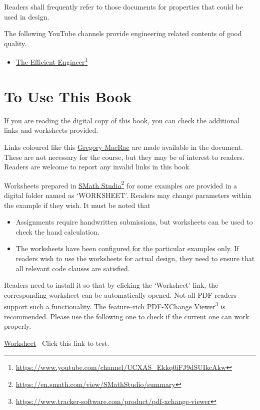 Readers shall frequently refer to those documents for properties that could be used in design.

The following YouTube channels provide engineering related contents of good quality.
\begin{itemize}
\item \href{https://www.youtube.com/channel/UCXAS_Ekkq0iFJ9dSUIkcAkw}{The Efficient Engineer}\footnote{\url{https://www.youtube.com/channel/UCXAS_Ekkq0iFJ9dSUIkcAkw}}
\end{itemize}
\section{To Use This Book}
If you are reading the digital copy of this book, you can check the additional links and worksheets provided.

Links coloured like this \href{https://www.canterbury.ac.nz/engineering/contact-us/people/gregory-macrae.html}{Gregory MacRae} are made available in the document. These are not necessary for the course, but they may be of interest to readers. Readers are welcome to report any invalid links in this book.

Worksheets prepared in \href{https://en.smath.com/view/SMathStudio/summary}{SMath Studio}\footnote{\url{https://en.smath.com/view/SMathStudio/summary}} for some examples are provided in a digital folder named as `WORKSHEET'. Readers may change parameters within the example if they wish. It must be noted that
\begin{itemize}
\item Assignments require handwritten submissions, but worksheets can be used to check the hand calculation.
\item The worksheets have been configured for the particular examples only. If readers wish to use the worksheets for actual design, they need to ensure that all relevant code clauses are satisfied.
\end{itemize}

Readers need to install it so that by clicking the `Worksheet' link, the corresponding worksheet can be automatically opened. Not all PDF readers support such a functionality. The feature--rich \href{https://www.tracker-software.com/product/pdf-xchange-viewer}{PDF-XChange Viewer}\footnote{\url{https://www.tracker-software.com/product/pdf-xchange-viewer}} is recommended. Please use the following one to check if the current one can work properly.
\begin{exmp}
\href{run:./WORKSHEET/CH00/EX0.TEST.sm}{Worksheet}
\textleftarrow~Click this link to test.
\end{exmp}